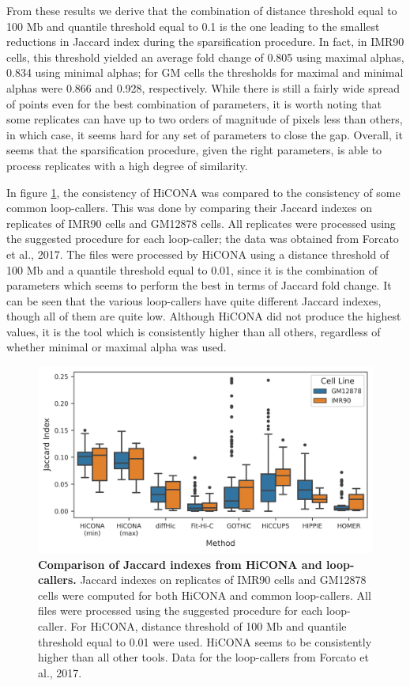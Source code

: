 From these results we derive that the combination of distance threshold equal to 100 Mb and quantile threshold equal to 0.1 is the one leading to the smallest reductions in Jaccard index during the sparsification procedure. In fact, in IMR90 cells, this threshold yielded an average fold change of 0.805 using maximal alphas, 0.834 using minimal alphas; for GM cells the thresholds for maximal and minimal alphas were 0.866 and 0.928, respectively. While there is still a fairly wide spread of points even for the best combination of parameters, it is worth noting that some replicates can have up to two orders of magnitude of pixels less than others, in which case, it seems hard for any set of parameters to close the gap. Overall, it seems that the sparsification procedure, given the right parameters, is able to process replicates with a high degree of similarity.

In figure \ref{fig:jaccardtools}, the consistency of HiCONA was compared to the consistency of some common loop-callers. This was done by comparing their Jaccard indexes on replicates of IMR90 cells and GM12878 cells. All replicates were processed using the suggested procedure for each loop-caller; the data was obtained from Forcato et al., 2017. The files were processed by HiCONA using a distance threshold of 100 Mb and a quantile threshold equal to 0.01, since it is the combination of parameters which seems to perform the best in terms of Jaccard fold change. It can be seen that the various loop-callers have quite different Jaccard indexes, though all of them are quite low. Although HiCONA did not produce the highest values, it is the tool which is consistently higher than all others, regardless of whether minimal or maximal alpha was used.

\begin{figure}[h]
  \centering 
  \includegraphics[width=1\textwidth]{jaccard_tools.png}
  \caption{\textbf{Comparison of Jaccard indexes from HiCONA and loop-callers.} Jaccard indexes on replicates of IMR90 cells and GM12878 cells were computed for both HiCONA and common loop-callers. All files were processed using the suggested procedure for each loop-caller. For HiCONA, distance threshold of 100 Mb and quantile threshold equal to 0.01 were used. HiCONA seems to be consistently higher than all other tools. Data for the loop-callers from Forcato et al., 2017.}
  \label{fig:jaccardtools}
\end{figure}

